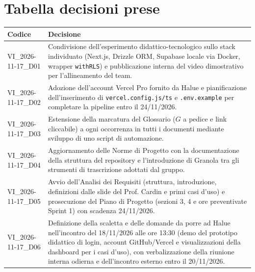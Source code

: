 \section{Tabella decisioni prese}
\renewcommand{\arraystretch}{1.3}
\noindent
\begin{tabularx}{\textwidth}{|l|X|}
    \hline
    \textbf{Codice} & \textbf{Decisione} \\
    \hline
    VI\_2026-11-17\_D01 & Condivisione dell'esperimento didattico-tecnologico sullo stack individuato (Next.js, Drizzle ORM, Supabase locale via Docker, wrapper \texttt{withRLS}) e pubblicazione interna del video dimostrativo per l'allineamento del team. \\
    \hline
    VI\_2026-11-17\_D02 & Adozione dell'account Vercel Pro fornito da Halue e pianificazione dell'inserimento di \texttt{vercel.config.js/ts} e \texttt{.env.example} per completare la pipeline entro il 24/11/2026. \\
    \hline
    VI\_2026-11-17\_D03 & Estensione della marcatura del Glossario ($G$ a pedice e link cliccabile) a ogni occorrenza in tutti i documenti mediante sviluppo di uno script di automazione. \\
    \hline
    VI\_2026-11-17\_D04 & Aggiornamento delle Norme di Progetto con la documentazione della struttura del repository e l'introduzione di Granola tra gli strumenti di trascrizione adottati dal gruppo. \\
    \hline
    VI\_2026-11-17\_D05 & Avvio dell'Analisi dei Requisiti (struttura, introduzione, definizioni dalle slide del Prof. Cardin e primi casi d'uso) e prosecuzione del Piano di Progetto (sezioni 3, 4 e ore preventivate Sprint 1) con scadenza 24/11/2026. \\
    \hline
    VI\_2026-11-17\_D06 & Definizione della scaletta e delle domande da porre ad Halue nell'incontro del 18/11/2026 alle ore 13:30 (demo del prototipo didattico di login, account GitHub/Vercel e visualizzazioni della dashboard per i casi d'uso), con verbalizzazione della riunione interna odierna e dell'incontro esterno entro il 20/11/2026. \\
    \hline
\end{tabularx}
